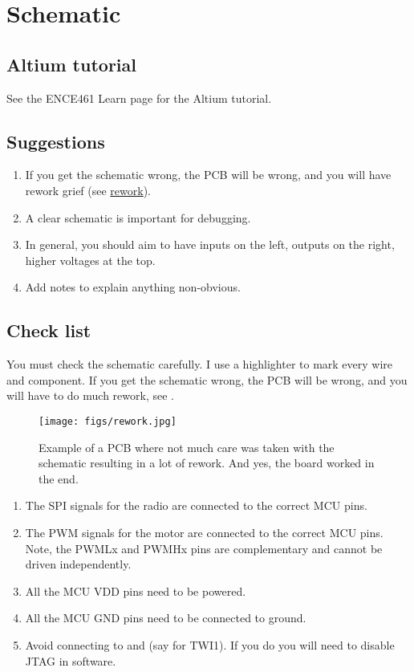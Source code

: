 \chapter{Schematic}


\section{Altium tutorial}


See the ENCE461 Learn page for the Altium tutorial.


\section{Suggestions}

\begin{enumerate}
\item If you get the schematic wrong, the PCB will be wrong, and you
  will have rework grief (see \hyperref[rework]{rework}).

\item A clear schematic is important for debugging.

\item In general, you should aim to have inputs on the left, outputs
  on the right, higher voltages at the top.

\item Add notes to explain anything non-obvious.
\end{enumerate}



\section{Check list}
\label{schematic-check-list}

You must check the schematic carefully.  I use a highlighter to mark
every wire and component.  If you get the schematic wrong, the PCB
will be wrong, and you will have to do much rework, see
.


\begin{figure}[!h]
  \centering
  \texttt{[image: figs/rework.jpg]}
  \caption{Example of a PCB where not much care was taken with the
    schematic resulting in a lot of rework.  And yes, the board worked
    in the end.}
  \label{fig:rework}
\end{figure}



\begin{enumerate}
\item
  The SPI signals for the radio are connected to the correct MCU pins.
\item
  The PWM signals for the motor are connected to the correct MCU pins.
  Note, the PWMLx and PWMHx pins are complementary and cannot be driven
  independently.
\item
  All the MCU VDD pins need to be powered.
\item
  All the MCU GND pins need to be connected to ground.
\item
  Avoid connecting to  and  (say for TWI1).  If you
  do you will need to disable JTAG in software.
\end{enumerate}
